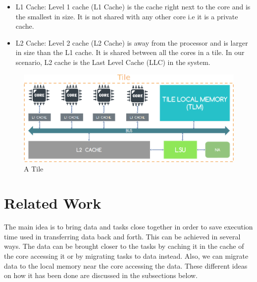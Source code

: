\documentclass{listhesis}
\begin{document}
\begin{itemize}
  \item L1 Cache: Level 1 cache (L1 Cache) is the cache right next to the core and is the smallest in size. It is not shared with any other core i.e it is a private cache.
  \item L2 Cache: Level 2 cache (L2 Cache) is away from the processor and is larger in size than the L1 cache. It is shared between all the cores in a tile. In our scenario, L2 cache is the Last Level Cache (LLC) in the system.
\end{itemize}
\begin{figure}
  \includegraphics[width=\linewidth]{tile.png}
  \centering
  \caption{A Tile}
  \label{fig:tile}
\end{figure}
\section{Related Work}
The main idea is to bring data and tasks close together in order to save execution time used in transferring data back and forth. This can be achieved in several ways. The data can be brought closer to the tasks by caching it in the cache of the core accessing it or by migrating tasks to data instead. Also, we can migrate data to the local memory near the core accessing the data. These different ideas on how it has been done are discussed in the subsections below. 
\end{document}
